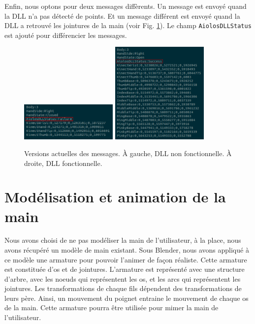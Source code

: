 Enfin, nous optons pour deux messages diffèrents. Un message 
est envoyé quand la DLL n'a pas détecté de points. Et un message 
différent est envoyé quand la DLL a retrouvé les jointures de la main (voir Fig. \ref{fig:socketv3}).
Le champ \texttt{AiolosDLLStatus} est ajouté pour différencier les 
messages.

\begin{figure}[H]
  \label{fig:socketv3}
  \begin{center}
    \includegraphics[width=180px]{images/socket_v3-2.png}
    \includegraphics[width=180px]{images/socket_v3-1.png}
    \caption{Versions actuelles des messages. À gauche, DLL non fonctionnelle. À droite, DLL fonctionnelle.}
  \end{center}
\end{figure}


\section{Modélisation et animation de la main}
\label{Real_Animation}
\paragraph{}
Nous avons choisi de ne pas modéliser la main de l'utilisateur, à la place, nous avons récupéré un modèle de main existant.
Sous Blender, nous avons appliqué à ce modèle une armature pour pouvoir l'animer de façon réaliste. Cette armature est constituée d'os et de jointures. L'armature est représenté avec une structure 
d'arbre, avec les noeuds qui représentent les os, et les arcs qui représentent les jointures. Les transformations de chaque fils dépendent des transformations de leurs père. Ainsi, un mouvement du poignet 
entraine le mouvement de chaque os de la main. Cette armature pourra être utilisée pour mimer la main de l'utilisateur. 

